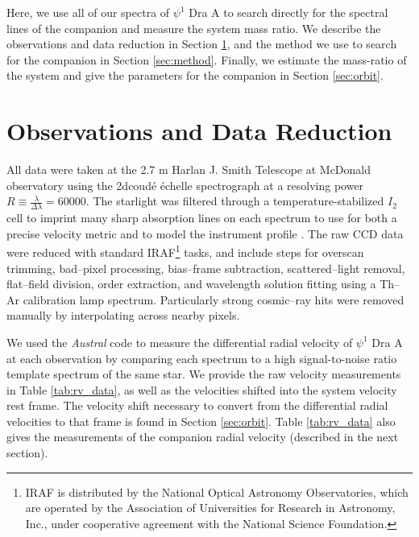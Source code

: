 Here, we use all of our spectra of $\psi^1$ Dra A to search directly for the spectral lines of the companion and measure the system mass ratio. We describe the observations and data reduction in Section \ref{sec:obs}, and the method we use to search for the companion in Section \ref{sec:method}. Finally, we estimate the mass-ratio of the system and give the parameters for the companion in Section \ref{sec:orbit}.


\section{Observations and Data Reduction}
\label{sec:obs}
All data were taken at the 2.7 m Harlan J. Smith Telescope at McDonald observatory using the 2dcoud\'e \'echelle spectrograph \citep{TS23} at a resolving power $R\equiv \frac{\lambda}{\Delta \lambda} = 60000$. The starlight was filtered through a temperature-stabilized $I_2$ cell to imprint many sharp absorption lines on each spectrum to use for both a precise velocity metric \citep{Butler1996} and to model the instrument profile \citep{Endl2000}. The raw CCD data were reduced with standard IRAF\footnote{IRAF is distributed by the National Optical Astronomy Observatories, which are operated by the Association of Universities for Research in Astronomy, Inc., under cooperative agreement with the National Science Foundation.} tasks, and include steps for overscan trimming, bad--pixel processing, bias--frame subtraction, scattered--light removal, flat--field division, order extraction, and wavelength solution fitting using a Th--Ar calibration lamp spectrum. Particularly strong cosmic--ray hits were removed manually by interpolating across nearby pixels.

We used the \emph{Austral} code \citep{Endl2000} to measure the differential radial velocity of $\psi^1$ Dra A at each observation by comparing each spectrum to a high signal-to-noise ratio template spectrum of the same star. We provide the raw velocity measurements in Table \ref{tab:rv_data}, as well as the velocities shifted into the system velocity rest frame. The velocity shift necessary to convert from the differential radial velocities to that frame is found in Section \ref{sec:orbit}. Table \ref{tab:rv_data} also gives the measurements of the companion radial velocity (described in the next section).


